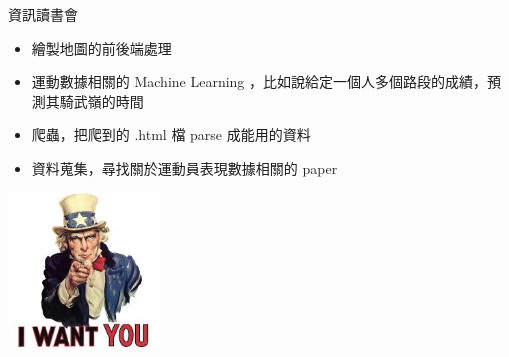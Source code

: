 \begin{frame}{資訊讀書會}
\begin{itemize}
\item 繪製地圖的前後端處理\pause
\item 運動數據相關的 Machine Learning ，比如說給定一個人多個路段的成績，預測其騎武嶺的時間\pause
\item 爬蟲，把爬到的 .html 檔 parse 成能用的資料\pause
\item 資料蒐集，尋找關於運動員表現數據相關的 paper\pause
\end{itemize}
\begin{center}
\includegraphics[width=4cm]{IWantYou.jpeg}
\end{center}
\end{frame}
